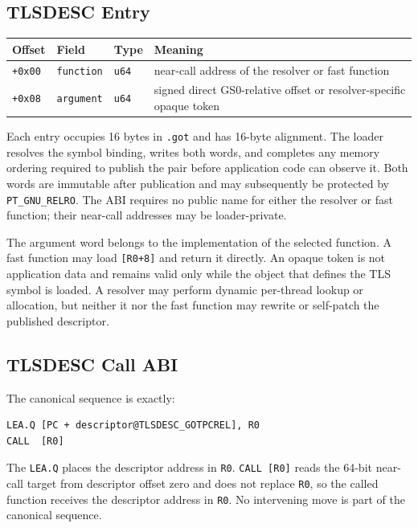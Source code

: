 \documentclass[10pt,twoside]{article}
\begin{document}
\subsection{TLSDESC Entry}
\begingroup\footnotesize
\setlength{\tabcolsep}{2pt}
\begin{longtable}{@{}p{0.8in}p{1.7in}p{0.65in}p{2.35in}@{}}
\toprule
\textbf{Offset} & \textbf{Field} & \textbf{Type} & \textbf{Meaning}\\
\midrule
\endhead
\texttt{+0x00} & \texttt{function} & \texttt{u64} & near-call address of the resolver or fast function\\
\texttt{+0x08} & \texttt{argument} & \texttt{u64} & signed direct GS0-relative offset or resolver-specific opaque token\\
\bottomrule
\end{longtable}
\endgroup

Each entry occupies 16 bytes in \texttt{.got} and has 16-byte alignment. The
loader resolves the symbol binding, writes both words, and completes any memory
ordering required to publish the pair before application code can observe it.
Both words are immutable after publication and may subsequently be protected by
\texttt{PT\_GNU\_RELRO}. The ABI requires no public name for either the
resolver or fast function; their near-call addresses may be loader-private.

The argument word belongs to the implementation of the selected function. A
fast function may load \texttt{[R0+8]} and return it directly. An opaque token
is not application data and remains valid only while the object that defines
the TLS symbol is loaded. A resolver may perform dynamic per-thread lookup or
allocation, but
neither it nor the fast function may rewrite or self-patch the published
descriptor.
\subsection{TLSDESC Call ABI}
The canonical sequence is exactly:
\begin{verbatim}
LEA.Q [PC + descriptor@TLSDESC_GOTPCREL], R0
CALL  [R0]
\end{verbatim}
The \texttt{LEA.Q} places the descriptor address in \texttt{R0}.
\texttt{CALL [R0]} reads the 64-bit near-call target from descriptor offset
zero and does not replace \texttt{R0}, so the called function receives the
descriptor address in \texttt{R0}. No intervening move is part of the
canonical sequence.
\end{document}

